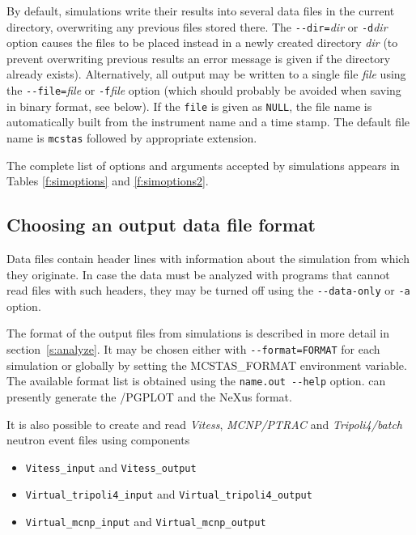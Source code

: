 By default, \MCS simulations write their results into several data files in the
current directory, overwriting any previous files stored there. The
\verb+--dir=+\textit{dir} or \verb+-d+\textit{dir} option causes the files to be
placed instead in a newly created directory \textit{dir} (to prevent overwriting
previous results an error message is given if the directory already exists).
Alternatively, all output may be written to a single file \textit{file} using
the \verb+--file=+\textit{file} or \verb+-f+\textit{file} option (which should
probably be avoided when saving in binary format, see below). If the \verb+file+
is given as \verb+NULL+, the file name is automatically built from the
instrument name and a time stamp. The default file name is \verb+mcstas+
followed by appropriate extension.

The complete list of options
and arguments accepted by \MCS simulations appears in
Tables \ref{f:simoptions} and \ref{f:simoptions2}.

\subsection{Choosing an output data file format}

Data files contain header lines with information about the simulation from which
they originate. In case the data must be analyzed with programs that cannot read
files with such headers, they may be turned off using the \verb+--data-only+ or
\verb+-a+ option.  

The format of the output files from \MCS simulations is described in more
detail in section~\ref{s:analyze}. It may be chosen either with
\verb+--format=FORMAT+ for each simulation or globally by setting the
MCSTAS\_FORMAT environment variable.
The available format list is obtained using the \verb+name.out --help+ option.
\MCS can presently generate the \MCS /PGPLOT and the NeXus format. 

It is also possible to create and read \textit{Vitess}, \textit{MCNP/PTRAC} and
\textit{Tripoli4/batch} neutron event files using components
\begin{itemize}
\item \verb+Vitess_input+ and \verb+Vitess_output+
\item \verb+Virtual_tripoli4_input+ and \verb+Virtual_tripoli4_output+
\item \verb+Virtual_mcnp_input+ and \verb+Virtual_mcnp_output+
\end{itemize}  

